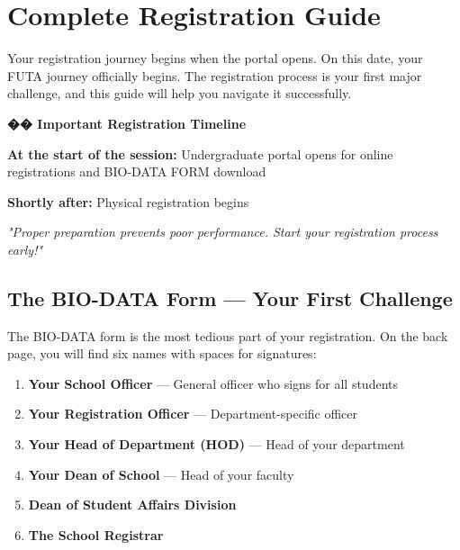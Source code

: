 \documentclass[11pt,a4paper]{article}
\newcommand{\quotetext}[1]{\begin{quotebox}\itshape\color{primary}#1\end{quotebox}}
\begin{document}
\section{Complete Registration Guide}

Your registration journey begins when the portal opens. On this date, your FUTA journey officially begins. The registration process is your first major challenge, and this guide will help you navigate it successfully.

\begin{inspirational}
    \textbf{\color{primary}\Large �� Important Registration Timeline}

    \vspace{0.5em}

    \textbf{At the start of the session:} Undergraduate portal opens for online registrations and BIO-DATA FORM download

    \vspace{0.3em}

    \textbf{Shortly after:} Physical registration begins

    \vspace{0.5em}

    \quotetext{"Proper preparation prevents poor performance. Start your registration process early!"}
\end{inspirational}

\subsection{The BIO-DATA Form --- Your First Challenge}

The BIO-DATA form is the most tedious part of your registration. On the back page, you will find six names with spaces for signatures:

\begin{enumerate}[leftmargin=1.5em, itemsep=0.3em]
    \item \textbf{Your School Officer} --- General officer who signs for all students
    \item \textbf{Your Registration Officer} --- Department-specific officer
    \item \textbf{Your Head of Department (HOD)} --- Head of your department
    \item \textbf{Your Dean of School} --- Head of your faculty
    \item \textbf{Dean of Student Affairs Division}
    \item \textbf{The School Registrar}
\end{enumerate}
\end{document}
